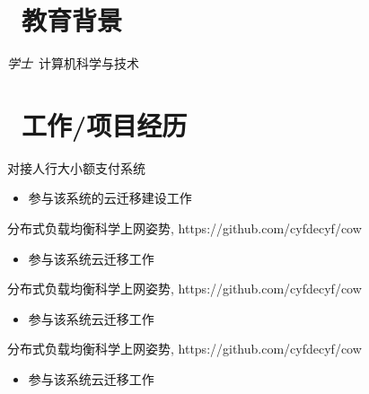 \documentclass{resume}
\begin{document}


 
\section{\faGraduationCap\  教育背景}
\textit{学士}\ 计算机科学与技术

\section{\faUsers\ 工作/项目经历}

\begin{onehalfspacing}
对接人行大小额支付系统
\begin{itemize}
  \item 参与该系统的云迁移建设工作
\end{itemize}
\end{onehalfspacing}

\begin{onehalfspacing}
分布式负载均衡科学上网姿势, https://github.com/cyfdecyf/cow
\begin{itemize}
  \item 参与该系统云迁移工作
\end{itemize}
\end{onehalfspacing}

\begin{onehalfspacing}
分布式负载均衡科学上网姿势, https://github.com/cyfdecyf/cow
\begin{itemize}
  \item 参与该系统云迁移工作
\end{itemize}
\end{onehalfspacing}

\begin{onehalfspacing}
分布式负载均衡科学上网姿势, https://github.com/cyfdecyf/cow
\begin{itemize}
  \item 参与该系统云迁移工作
\end{itemize}
\end{onehalfspacing}
\end{document}
